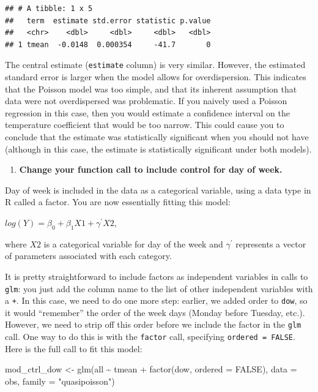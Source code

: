 \documentclass[
]{book}
\newenvironment{Shaded}{\begin{snugshade}}{\end{snugshade}}
\newcommand{\AttributeTok}[1]{\textcolor[rgb]{0.77,0.63,0.00}{#1}}
\newcommand{\ConstantTok}[1]{\textcolor[rgb]{0.00,0.00,0.00}{#1}}
\newcommand{\FunctionTok}[1]{\textcolor[rgb]{0.00,0.00,0.00}{#1}}
\newcommand{\NormalTok}[1]{#1}
\newcommand{\OtherTok}[1]{\textcolor[rgb]{0.56,0.35,0.01}{#1}}
\newcommand{\SpecialCharTok}[1]{\textcolor[rgb]{0.00,0.00,0.00}{#1}}
\newcommand{\StringTok}[1]{\textcolor[rgb]{0.31,0.60,0.02}{#1}}
\providecommand{\tightlist}{%
  \setlength{\itemsep}{0pt}\setlength{\parskip}{0pt}}
\begin{document}
\begin{verbatim}
## # A tibble: 1 x 5
##   term  estimate std.error statistic p.value
##   <chr>    <dbl>     <dbl>     <dbl>   <dbl>
## 1 tmean  -0.0148  0.000354     -41.7       0
\end{verbatim}

The central estimate (\texttt{estimate} column) is very similar. However, the estimated
standard error is larger when the model allows for overdispersion. This
indicates that the Poisson model was too simple, and that its inherent
assumption that data were not overdispersed was problematic. If you naively used
a Poisson regression in this case, then you would estimate a confidence
interval on the temperature coefficient that would be too narrow. This could
cause you to conclude that the estimate was statistically significant when
you should not have (although in this case, the estimate is statistically
significant under both models).

\begin{enumerate}
\def\labelenumi{\arabic{enumi}.}
\setcounter{enumi}{3}
\tightlist
\item
  \textbf{Change your function call to include control for day of week.}
\end{enumerate}

Day of week is included in the data as a categorical variable, using a
data type in R called a factor. You are now essentially fitting this model:

\(log(Y)=\beta_{0}+\beta_{1}X1+\gamma^{'}X2\),

where \(X2\) is a categorical variable for day of the week and \(\gamma^{'}\)
represents a vector of parameters associated with each category.

It is pretty straightforward to include factors as independent variables in calls
to \texttt{glm}: you just add the column name to the list of other independent variables
with a \texttt{+}. In this case, we need to do one more step: earlier, we added order to
\texttt{dow}, so it would ``remember'' the order of the week days (Monday before Tuesday,
etc.). However, we need to strip off this order before we include the factor in
the \texttt{glm} call. One way to do this is with the \texttt{factor} call, specifying
\texttt{ordered\ =\ FALSE}. Here is the full call to fit this model:

\begin{Shaded}
\begin{Highlighting}[]
\NormalTok{mod\_ctrl\_dow }\OtherTok{\textless{}{-}} \FunctionTok{glm}\NormalTok{(all }\SpecialCharTok{\textasciitilde{}}\NormalTok{ tmean }\SpecialCharTok{+} \FunctionTok{factor}\NormalTok{(dow, }\AttributeTok{ordered =} \ConstantTok{FALSE}\NormalTok{), }
                    \AttributeTok{data =}\NormalTok{ obs, }\AttributeTok{family =} \StringTok{"quasipoisson"}\NormalTok{)}
\end{Highlighting}
\end{Shaded}
\end{document}
